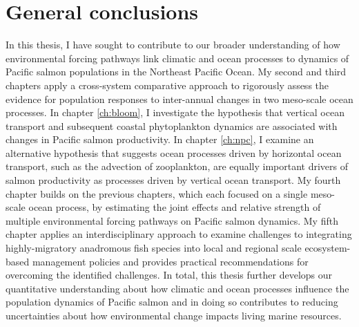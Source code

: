 
\chapter[General conclusions]{General conclusions}
\label{ch:conclude}

In this thesis, I have sought to contribute to our broader understanding of how
environmental forcing pathways link climatic and ocean processes to dynamics of
Pacific salmon populations in the Northeast Pacific Ocean. My second and third
chapters apply a cross-system comparative approach to rigorously assess the
evidence for population responses to inter-annual changes in two meso-scale
ocean processes. In chapter \ref{ch:bloom}, I investigate the hypothesis that
vertical ocean transport and subsequent coastal phytoplankton dynamics are
associated with changes in Pacific salmon productivity. In chapter \ref{ch:npc},
I examine an alternative hypothesis that suggests ocean processes driven by
horizontal ocean transport, such as the advection of zooplankton, are equally
important drivers of salmon productivity as processes driven by vertical ocean
transport. My fourth chapter builds on the previous chapters, which each focused
on a single meso-scale ocean process, by estimating the joint effects and
relative strength of multiple environmental forcing pathways on Pacific salmon
dynamics. My fifth chapter applies an interdisciplinary approach to examine
challenges to integrating highly-migratory anadromous fish species into local
and regional scale ecosystem-based management policies and provides practical
recommendations for overcoming the identified challenges. In total, this thesis
further develops our quantitative understanding about how climatic and ocean
processes influence the population dynamics of Pacific salmon and in doing so
contributes to reducing uncertainties about how environmental change impacts
living marine resources.

